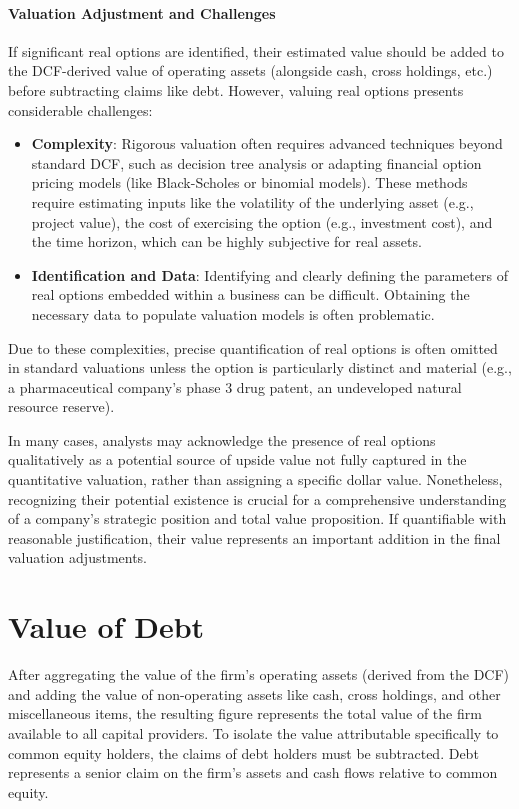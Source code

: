 \paragraph{Valuation Adjustment and Challenges}
If significant real options are identified, their estimated value should be added to the DCF-derived value of operating assets (alongside cash, cross holdings, etc.) before subtracting claims like debt. However, valuing real options presents considerable challenges:
\begin{itemize}
    \item \textbf{Complexity}: Rigorous valuation often requires advanced techniques beyond standard DCF, such as decision tree analysis or adapting financial option pricing models (like Black-Scholes or binomial models). These methods require estimating inputs like the volatility of the underlying asset (e.g., project value), the cost of exercising the option (e.g., investment cost), and the time horizon, which can be highly subjective for real assets.
    \item \textbf{Identification and Data}: Identifying and clearly defining the parameters of real options embedded within a business can be difficult. Obtaining the necessary data to populate valuation models is often problematic.
\end{itemize}

Due to these complexities, precise quantification of real options is often omitted in standard valuations unless the option is particularly distinct and material (e.g., a pharmaceutical company's phase 3 drug patent, an undeveloped natural resource reserve).

In many cases, analysts may acknowledge the presence of real options qualitatively as a potential source of upside value not fully captured in the quantitative valuation, rather than assigning a specific dollar value. Nonetheless, recognizing their potential existence is crucial for a comprehensive understanding of a company's strategic position and total value proposition. If quantifiable with reasonable justification, their value represents an important addition in the final valuation adjustments.

\section{Value of Debt}

After aggregating the value of the firm's operating assets (derived from the DCF) and adding the value of non-operating assets like cash, cross holdings, and other miscellaneous items, the resulting figure represents the total value of the firm available to all capital providers. To isolate the value attributable specifically to common equity holders, the claims of debt holders must be subtracted. Debt represents a senior claim on the firm's assets and cash flows relative to common equity.

